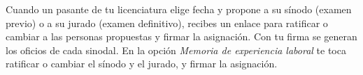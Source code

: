 \documentclass[11pt,a4paper]{article}
\begin{document}
{\small\tableofcontents}
\newpage
\begin{quevasahacer}
Cuando un pasante de tu licenciatura elige fecha y propone a su sínodo (examen previo) o a su jurado (examen definitivo), recibes un enlace para ratificar o cambiar a las personas propuestas y firmar la asignación. Con tu firma se generan los oficios de cada sinodal. En la opción \emph{Memoria de experiencia laboral} te toca ratificar o cambiar el sínodo y el jurado, y firmar la asignación.
\end{quevasahacer}



\end{document}
